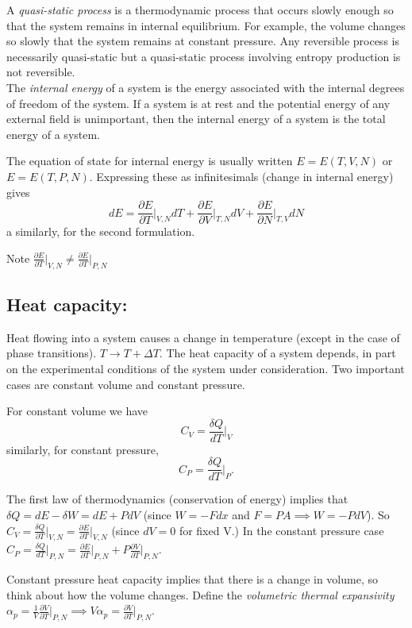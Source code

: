 \documentclass{article}
\begin{document}
A \textit{quasi-static process} is a thermodynamic process that occurs slowly enough so that the system remains in internal equilibrium. For example, the volume changes so slowly that the system remains at constant pressure. Any reversible process is necessarily quasi-static but a quasi-static process involving entropy production is not reversible. \\

The \emph{internal energy} of a system is the energy associated with the internal degrees of freedom of the system. If a system is at rest and the potential energy of any external field is unimportant, then the internal energy of a system is the total energy of a system.

The equation of state for internal energy is usually written $E = E(T,V,N)$ or $E = E(T,P,N)$. Expressing these as infinitesimals (change in internal energy) gives
$$ dE = \frac{\partial E}{\partial T}\bigg\vert_{V,N}dT + \frac{\partial E}{\partial V}\bigg\vert_{T,N}dV +\frac{\partial E}{\partial N}\bigg\vert_{T,V}dN$$
a similarly, for the second formulation.

Note $ \frac{\partial E}{\partial T}\vert_{V,N} \neq \frac{\partial E}{\partial T}\vert_{P,N} $

\subsection{Heat capacity:}
Heat flowing into a system causes a change in temperature (except in the case of phase transitions). $T\rightarrow T+\Delta T$. The heat capacity of a system depends, in part on the experimental conditions of the system under consideration. Two important cases are constant volume and constant pressure.

For constant volume we have
$$C_V = \frac{\delta Q}{dT}\bigg\vert_V$$
similarly, for constant pressure,
$$C_P = \frac{\delta Q}{dT}\bigg\vert_P.$$

The first law of thermodynamics (conservation of energy) implies that $\delta Q = dE - \delta W = dE + PdV$  (since $W = -Fdx$ and $F=PA \implies W = -PdV$). So
$C_V = \frac{\delta Q}{\partial T}\vert_{V,N} = \frac{\partial E}{\partial T}\vert_{V,N}$ (since $dV=0$ for fixed V.)
In the constant pressure case $C_P = \frac{\delta Q}{dT}\vert_{P,N} = \frac{\partial E}{\partial T}\vert_{P,N} + P\frac{\partial V}{\partial T}\vert_{P,N}$.

Constant pressure heat capacity implies that there is a change in volume, so think about how the volume changes. Define the \emph{volumetric thermal expansivity} $\alpha_p = \frac{1}{V}\frac{\partial V}{\partial T}\vert_{P,N} \implies V\alpha_p =\frac{\partial V}{\partial T}\vert_{P,N}$.
\end{document}
